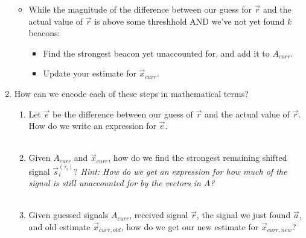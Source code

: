 \begin{enumerate}
\begin{itemize}
        \item While the magnitude of the difference between our guess for $\vec{r}$ and the actual value of $\vec{r}$ is
        above some threshhold AND we've not yet found $k$ beacons:
        \begin{itemize}
            \item Find the strongest beacon yet unaccounted for, and add it to $A_{curr}$.
            \item Update your estimate for $\vec{x}_{curr}$.
        \end{itemize}
    \end{itemize}

    \item How can we encode each of these steps in mathematical terms?
    \begin{enumerate}
        \item Let $\vec{e}$ be the difference between our guess of $\vec{r}$ and the actual value of $\vec{r}$.
        How do we write an expression for $\vec{e}$.
        \\ \\
        \item Given $A_{curr}$ and $\vec{x}_{curr}$, how do we find the strongest remaining shifted signal $\vec{s}_i^{(\tau_i)}$?
        \textit{Hint: How do we get an expression for how much of the signal is still unaccounted for by the vectors in $A$?}
        \\ \\
        \item Given guessed signals $A_{curr}$, received signal $\vec{r}$, the signal we just found $\vec{a}$, and old estimate
        $\vec{x}_{curr, old}$, how do we get our new estimate for $\vec{x}_{curr, new}$?
        \\ \\
        \sol{
}
\end{enumerate}
\end{enumerate}
